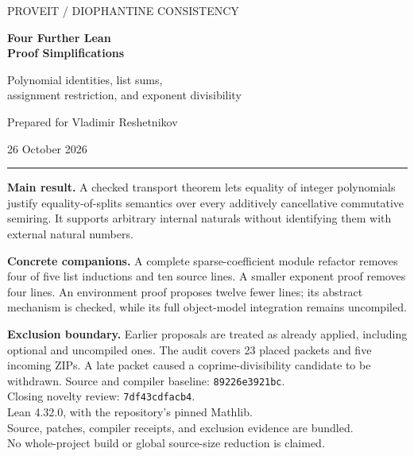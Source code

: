\documentclass[11pt,letterpaper]{article}
\newcommand{\code}[1]{\nolinkurl{#1}}
\begin{document}
\begin{titlepage}
\vspace*{0.5in}
{\Large\sffamily\color{accent} PROVEIT / DIOPHANTINE CONSISTENCY\par}
\vspace{0.28in}
{\Huge\sffamily\bfseries\color{ink} Four Further Lean\\[4pt] Proof Simplifications\par}
\vspace{0.25in}
{\Large Polynomial identities, list sums,\\assignment restriction, and exponent divisibility\par}
\vspace{0.35in}
{\large Prepared for Vladimir Reshetnikov\par}
26 October 2026
\vspace{0.35in}
\hrule
\vspace{0.18in}
\textbf{Main result.} A checked transport theorem lets equality of integer polynomials
justify equality-of-splits semantics over every additively cancellative commutative
semiring. It supports arbitrary internal naturals without identifying them with
external natural numbers.

\textbf{Concrete companions.} A complete sparse-coefficient module refactor removes
four of five list inductions and ten source lines. A smaller exponent proof removes
four lines. An environment proof proposes twelve fewer lines; its abstract
mechanism is checked, while its full object-model integration remains uncompiled.

\textbf{Exclusion boundary.} Earlier proposals are treated as already applied,
including optional and uncompiled ones. The audit covers 23 placed packets and
five incoming ZIPs. A late packet caused a coprime-divisibility candidate to be
withdrawn.
\vfill
{\small\color{muted}
Source and compiler baseline: \code{89226e3921bc}.\\
Closing novelty review: \code{7df43cdfacb4}.\\
Lean 4.32.0, with the repository's pinned Mathlib.\\
Source, patches, compiler receipts, and exclusion evidence are bundled.\\
No whole-project build or global source-size reduction is claimed.}
\end{titlepage}
\begingroup
\small
\setlength{\parskip}{0pt}
\tableofcontents
\endgroup
\newpage




\end{document}
